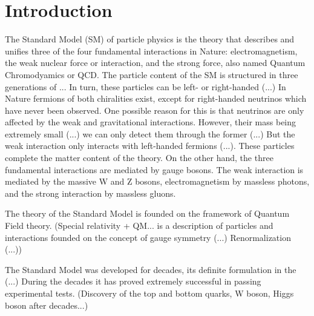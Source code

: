 \chapter*{Introduction}


\label{ch_introduction}


The Standard Model (SM) of particle physics is the theory that describes and unifies three of the four fundamental interactions in Nature: electromagnetism, the weak nuclear force or interaction, and the strong force, also named Quantum Chromodyamics or QCD. The particle content of the SM is structured in three generations of ... In turn, these particles can be left- or right-handed (...) In Nature fermions of both chiralities exist, except for right-handed neutrinos which have never been observed. One possible reason for this is that neutrinos are only affected by the weak and gravitational interactions. However, their mass being extremely small (...) we can only detect them through the former (...) But the weak interaction only interacts with left-handed fermions (...). These particles complete the matter content of the theory. On the other hand, the three fundamental interactions are mediated by gauge bosons. The weak interaction is mediated by the massive W and Z bosons, electromagnetism by massless photons, and the strong interaction by massless gluons.  

The theory of the Standard Model is founded on the framework of Quantum Field theory. (Special relativity + QM... is a description of particles and interactions founded on the concept of gauge symmetry (...) Renormalization (...))

The Standard Model was developed for decades, its definite formulation in the (...) During the decades it has proved extremely successful in passing experimental tests. (Discovery of the top and bottom quarks, W boson, Higgs boson after decades...)

